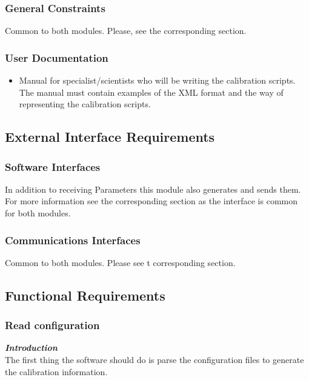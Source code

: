 \subsubsection{General Constraints}

Common to both modules. Please, see the corresponding section.

\subsubsection{User Documentation}
\begin{itemize}
\item Manual for specialist/scientists who will be writing the calibration scripts. The manual must contain examples of the XML format and the way of representing the calibration scripts.
\end{itemize}

\subsection{External Interface Requirements}

\subsubsection{Software Interfaces}

In addition to receiving Parameters this module also generates and sends them. For more information see the corresponding section as the interface is common for both modules.


\subsubsection{Communications Interfaces}

Common to both modules. Please see t corresponding section.

\pagebreak

\subsection{Functional Requirements}

\subsubsection{Read configuration}

\textbf{\emph{Introduction}}\\
The first thing the software should do is parse the configuration files to generate the calibration information.

